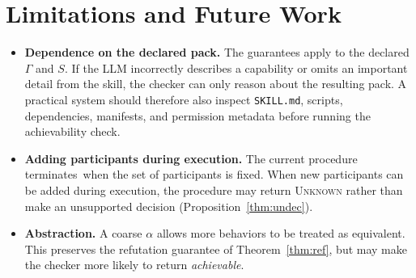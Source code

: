 \documentclass{article}
\theoremstyle{plain}
\theoremstyle{definition}
\newcommand{\id}[1]{\texttt{#1}}
\def \bgc {}
\def \egc {}
\begin{document}
\section{Limitations and Future Work}\label{sec:limitations}
\begin{itemize}\setlength{\itemsep}{1pt}
\item \textbf{Dependence on the declared pack.} The guarantees apply to the
declared $\Gamma$ and $S$. If the LLM incorrectly describes a capability or
omits an important detail from the skill, the checker can only reason about the
resulting pack. A practical system should therefore also inspect
\id{SKILL.md}, scripts, dependencies, manifests, and permission metadata before
running the achievability check.

\item \textbf{Adding participants during execution.} The current procedure
\bgc terminates\egc\ when the set of participants is fixed. When new participants can be
added during execution, the procedure may return \textsc{Unknown} rather than
make an unsupported decision (Proposition~\ref{thm:undec}).

\item \textbf{Abstraction.} A coarse $\alpha$ allows more behaviors to be treated
as equivalent. This preserves the refutation guarantee of Theorem~\ref{thm:ref},
but may make the checker more likely to return \emph{achievable}.


\end{itemize}
\end{document}
